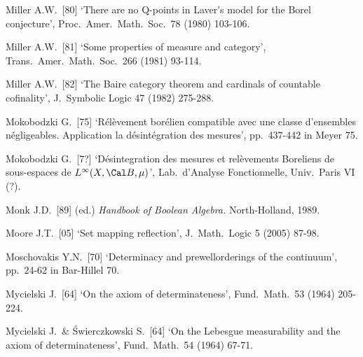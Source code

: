 {Miller A.W.\ [80] `There are no Q-points in Laver's model for the Borel
conjecture', Proc.\ Amer.\ Math.\ Soc.\ 78 (1980) 103-106.
\cmmnt{[\S538 {\it notes\/}.]}

Miller A.W.\ [81] `Some properties of measure and category',
Trans.\ Amer.\ Math.\ Soc.\ 266 (1981) 93-114.
\cmmnt{[522J.]}

Miller A.W.\ [82] `The Baire category theorem and cardinals of countable
cofinality', J.\ Symbolic Logic 47 (1982) 275-288.
\cmmnt{[552G, 552Xb.]}


Mokobodzki G.\ [75] `R\'el\`evement bor\'elien compatible avec une
classe d'ensembles n\'egligeables.  Application  la
d\'esint\'egration des mesures', pp.\ 437-442 in {\smc Meyer 75}.
\cmmnt{[535I.]}

Mokobodzki G.\ [7?] `D\'esintegration des mesures et rel\`evements
Boreliens de sous-espaces de $L^{\infty}(X,\Cal B,\mu)$',
Lab.\ d'Analyse Fonctionnelle, Univ.\ Paris VI (?).

Monk J.D.\ [89] (ed.) {\it Handbook of Boolean Algebra.}
North-Holland, 1989.


Moore J.T.\ [05] `Set mapping reflection', J.\ Math.\ Logic 5 (2005) 87-98.
\cmmnt{[517O.]}

Moschovakis Y.N.\ [70] `Determinacy and prewellorderings of the continuum',
pp.\ 24-62 in {\smc Bar-Hillel 70}.
\cmmnt{[567M.]}


Mycielski J.\ [64] `On the axiom of determinateness',
Fund.\ Math.\ 53 (1964) 205-224.
\cmmnt{[567D.]}


Mycielski J.\ \& \'Swierczkowski S.\ [64]
`On the Lebesgue measurability and the axiom of determinateness',
Fund.\ Math.\ 54 (1964) 67-71.
\cmmnt{[567F.]}

}

